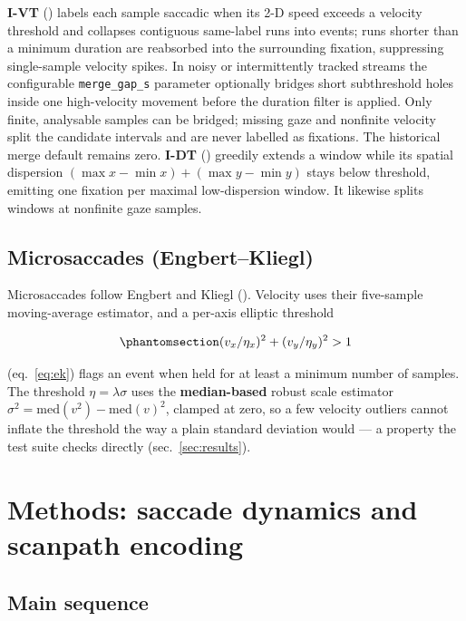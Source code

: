 \documentclass[
]{article}
\begin{document}
\textbf{I-VT} () labels each sample saccadic when its 2-D speed exceeds a
velocity threshold and collapses contiguous same-label runs into events;
runs shorter than a minimum duration are reabsorbed into the surrounding
fixation, suppressing single-sample velocity spikes. In noisy or
intermittently tracked streams the configurable \texttt{merge\_gap\_s}
parameter optionally bridges short subthreshold holes inside one
high-velocity movement before the duration filter is applied. Only
finite, analysable samples can be bridged; missing gaze and nonfinite
velocity split the candidate intervals and are never labelled as
fixations. The historical merge default remains zero. \textbf{I-DT}
()
greedily extends a window while its spatial dispersion
\((\max x - \min x) + (\max y - \min y)\) stays below threshold,
emitting one fixation per maximal low-dispersion window. It likewise
splits windows at nonfinite gaze samples.

\subsection{Microsaccades
(Engbert--Kliegl)}\label{microsaccades-engbertkliegl}

Microsaccades follow Engbert and Kliegl
(). Velocity uses their
five-sample moving-average estimator, and a per-axis elliptic threshold

\begin{equation}\protect\phantomsection\label{eq:ek}{(v_x / \eta_x)^2 + (v_y / \eta_y)^2 > 1}\end{equation}

(eq.~\ref{eq:ek}) flags an event when held for at least a minimum number
of samples. The threshold \(\eta = \lambda\sigma\) uses the
\textbf{median-based} robust scale estimator
\(\sigma^2 = \mathrm{med}(v^2) - \mathrm{med}(v)^2\), clamped at zero,
so a few velocity outliers cannot inflate the threshold the way a plain
standard deviation would --- a property the test suite checks directly
(sec.~\ref{sec:results}).

\section{Methods: saccade dynamics and scanpath
encoding}\label{sec:dynamics}

\subsection{Main sequence}\label{main-sequence}
\end{document}
